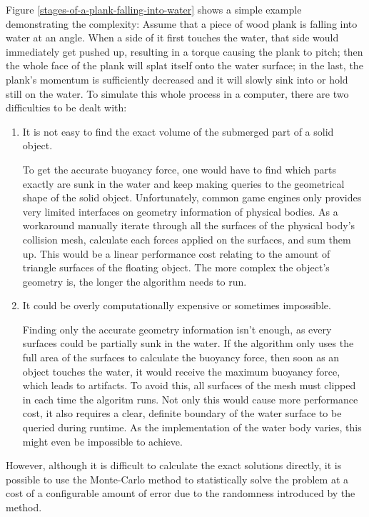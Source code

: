 Figure \ref{stages-of-a-plank-falling-into-water} shows a simple example demonstrating the complexity:
Assume that a piece of wood plank is falling into water at an angle.
When a side of it first touches the water, that side would immediately get pushed up, resulting in a torque causing the plank to pitch;
then the whole face of the plank will splat itself onto the water surface;
in the last, the plank's momentum is sufficiently decreased and it will slowly sink into or hold still on the water.
To simulate this whole process in a computer, there are two difficulties to be dealt with:

\begin{enumerate}
	\item It is not easy to find the exact volume of the submerged part of a solid object.

		To get the accurate buoyancy force, one would have to find which parts exactly are sunk in the water and keep making queries to the geometrical shape of the solid object.
		Unfortunately, common game engines only provides very limited interfaces on geometry information of physical bodies.
		As a workaround manually iterate through all the surfaces of the physical body's collision mesh, calculate each forces applied on the surfaces, and sum them up.
		This would be a linear performance cost relating to the amount of triangle surfaces of the floating object.
		The more complex the object's geometry is, the longer the algorithm needs to run.

	\item It could be overly computationally expensive or sometimes impossible.

		Finding only the accurate geometry information isn't enough, as every surfaces could be partially sunk in the water.
		If the algorithm only uses the full area of the surfaces to calculate the buoyancy force, then soon as an object touches the water, it would receive the maximum buoyancy force, which leads to artifacts.
		To avoid this, all surfaces of the mesh must clipped in each time the algoritm runs.
		Not only this would cause more performance cost, it also requires a clear, definite boundary of the water surface to be queried during runtime.
		As the implementation of the water body varies, this might even be impossible to achieve.
\end{enumerate}

However, although it is difficult to calculate the exact solutions directly, it is possible to use the Monte-Carlo method to statistically solve the problem at a cost of a configurable amount of error due to the randomness introduced by the method.